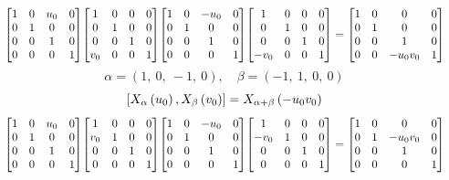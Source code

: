 \documentclass[11pt]{article}
\theoremstyle{definition}
\begin{document}
\[
\scaletoalign{\textwidth}{{\left[\begin{matrix}1 & 0 & u_{0} & 0\\0 & 1 & 0 & 0\\0 & 0 & 1 & 0\\0 & 0 & 0 & 1\end{matrix}\right]} {\left[\begin{matrix}1 & 0 & 0 & 0\\0 & 1 & 0 & 0\\0 & 0 & 1 & 0\\v_{0} & 0 & 0 & 1\end{matrix}\right]} {\left[\begin{matrix}1 & 0 & - u_{0} & 0\\0 & 1 & 0 & 0\\0 & 0 & 1 & 0\\0 & 0 & 0 & 1\end{matrix}\right]} {\left[\begin{matrix}1 & 0 & 0 & 0\\0 & 1 & 0 & 0\\0 & 0 & 1 & 0\\- v_{0} & 0 & 0 & 1\end{matrix}\right]} = {\left[\begin{matrix}1 & 0 & 0 & 0\\0 & 1 & 0 & 0\\0 & 0 & 1 & 0\\0 & 0 & - u_{0} v_{0} & 1\end{matrix}\right]}}
\]
\[
\alpha = \left( 1, \  0, \  -1, \  0\right), \quad \beta = \left( -1, \  1, \  0, \  0\right)
\]
\[
\scaletoalign{\textwidth}{\left[ X_{\alpha}\left(u_{0}\right), X_{\beta}\left(v_{0}\right) \right] = X_{\alpha + \beta}\left(- u_{0} v_{0}\right)}
\]
\[
\scaletoalign{\textwidth}{{\left[\begin{matrix}1 & 0 & u_{0} & 0\\0 & 1 & 0 & 0\\0 & 0 & 1 & 0\\0 & 0 & 0 & 1\end{matrix}\right]} {\left[\begin{matrix}1 & 0 & 0 & 0\\v_{0} & 1 & 0 & 0\\0 & 0 & 1 & 0\\0 & 0 & 0 & 1\end{matrix}\right]} {\left[\begin{matrix}1 & 0 & - u_{0} & 0\\0 & 1 & 0 & 0\\0 & 0 & 1 & 0\\0 & 0 & 0 & 1\end{matrix}\right]} {\left[\begin{matrix}1 & 0 & 0 & 0\\- v_{0} & 1 & 0 & 0\\0 & 0 & 1 & 0\\0 & 0 & 0 & 1\end{matrix}\right]} = {\left[\begin{matrix}1 & 0 & 0 & 0\\0 & 1 & - u_{0} v_{0} & 0\\0 & 0 & 1 & 0\\0 & 0 & 0 & 1\end{matrix}\right]}}
\]
\end{document}
